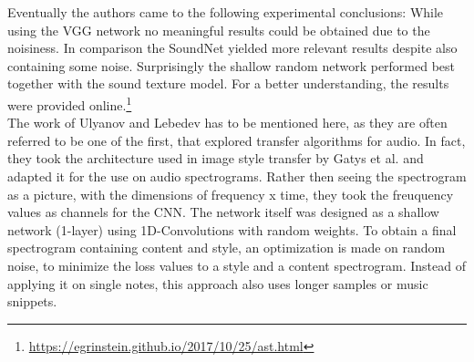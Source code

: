 Eventually the authors came to the following experimental conclusions: While using the VGG network no meaningful results could be obtained due to the noisiness. In comparison the SoundNet yielded more relevant results despite also containing some noise. Surprisingly the shallow random network performed best together with the sound texture model. For a better understanding, the results were provided online.\footnote{\url{https://egrinstein.github.io/2017/10/25/ast.html}}\\

The work of Ulyanov and Lebedev has to be mentioned here, as they are often referred to be one of the first, that explored transfer algorithms for audio. \cite{ulyanov2016audio} In fact, they took the architecture used in image style transfer by Gatys et al. and adapted it for the use on audio spectrograms. Rather then seeing the spectrogram as a picture, with the dimensions of frequency x time, they took the freuquency values as channels for the CNN. The network itself was designed as a shallow network (1-layer) using 1D-Convolutions with random weights. To obtain a final spectrogram containing content and style, an optimization is made on random noise, to minimize the loss values to a style and a content spectrogram. Instead of applying it on single notes, this approach also uses longer samples or music snippets. 

